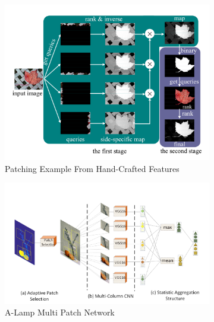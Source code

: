 \begin{figure}
    \centering
    \begin{subfigure}[b]{0.25\textwidth}
        \includegraphics[width=\textwidth]{figures/Literature Review/yang2017_graph_based.png}
        \caption{Patching Example From Hand-Crafted Features \cite{Yang2013}}
        \label{fig:graph_patch}
    \end{subfigure}
    \hspace{5mm}
    \begin{subfigure}[b]{0.3\textwidth}
        \includegraphics[width=\textwidth]{figures/Literature Review/alamp_patch.png}
        \caption{A-Lamp Multi Patch Network  \cite{Ma2017}}
        \label{fig:alamp_multi}
    \end{subfigure}
    \hspace{5mm}
    \begin{subfigure}[b]{0.25\textwidth}

\end{subfigure}
\end{figure}
